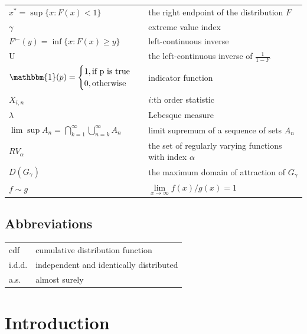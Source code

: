 \documentclass[english,12pt,a4paper,pdftex,sci,utf8]{aaltothesis} %
\begin{document}
\begin{tabular}{ll}
$x^*=\sup\{x : F(x)<1\}$  & the right endpoint of the distribution $F$ \\
$\gamma$ & extreme value index \\
$F^{\leftarrow}(y) = \inf\{x:F(x) \geq y \}$ & left-continuous inverse \\
U & the left-continuous inverse of $\frac{1}{1-F}$ \\
$\mathbbm{1}(p)=
\begin{cases}
1 , \textrm{if p is true}\\
0, \textrm{otherwise}
\end{cases}$ & indicator function \\
$X_{i,n}$ & $i$:th order statistic \\
$\lambda$ & Lebesque measure \\
$\lim \sup A_n = \bigcap_{k=1}^{\infty} \bigcup_{n=k}^{\infty} A_n$ & limit supremum of a sequence of sets $A_n$ \\
$RV_{\alpha}$ & the set of regularly varying functions with index $\alpha$ \\
$D(G_{\gamma})$ & the maximum domain of attraction of $G_{\gamma}$ \\
$f \sim g$ & $\lim\limits_{x \rightarrow \infty} f(x)/g(x)=1$ \\
\end{tabular}


\subsection*{Abbreviations}

\begin{tabular}{ll}
cdf         & cumulative distribution function \\
i.d.d.     & independent and identically distributed \\
a.s.         & almost surely\\
\end{tabular}


\cleardoublepage

\section{Introduction}
\end{document}
